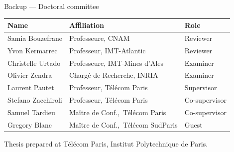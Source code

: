 \documentclass[aspectratio=169]{beamer}
\begin{document}
\begin{frame}{Backup --- Doctoral committee}

    {\small
    \begin{tabular}{@{}lll@{}}
        \toprule
        \textbf{Name} & \textbf{Affiliation} & \textbf{Role} \\
        \midrule
        Samia Bouzefrane     & Professeure, CNAM                      & Reviewer \\
        Yvon Kermarrec       & Professeur, IMT-Atlantic               & Reviewer \\
        Christelle Urtado    & Professeure, IMT-Mines d'Ales          & Examiner \\
        Olivier Zendra       & Charg\'e de Recherche, INRIA           & Examiner \\
        Laurent Pautet       & Professeur, T\'el\'ecom Paris          & Supervisor \\
        Stefano Zacchiroli   & Professeur, T\'el\'ecom Paris          & Co-supervisor \\
        Samuel Tardieu       & Ma\^itre de Conf.,\ T\'el\'ecom Paris  & Co-supervisor \\
        Gregory Blanc        & Ma\^itre de Conf.,\ T\'el\'ecom SudParis & Guest \\
        \bottomrule
    \end{tabular}
    }

    \vspace{1em}

    {\small Thesis prepared at T\'el\'ecom Paris, Institut Polytechnique de Paris.}
\end{frame}


%     
%     
\end{document}
